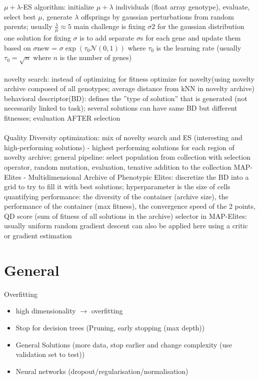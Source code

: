 \documentclass[a4paper, 10pt, twocolumn]{article}
\begin{document}
$\mu + \lambda$-ES algorithm: initialize $\mu + \lambda$ individuals (float array genotype), evaluate, select best $\mu$, generate
$\lambda$ offsprings by gaussian perturbations from random parents; usually $\frac{\lambda}{\mu} \approx 5$
main challenge is fixing $\sigma$2 for the gaussian distribution
one solution for fixing $\sigma$ is to add separate $\sigma$s for each gene and update them based on $\sigma$new = $\sigma \exp (\tau_0 \mathcal{N}(0, 1))$
where $\tau_0$ is the learning rate (usually $\tau_0 = \sqrt{n}$ where $n$ is the number of genes) \\ \\

novelty search: instead of optimizing for fitness optimize for novelty(using novelty archive composed of all
genotypes; average distance from kNN in novelty archive) behavioral descriptor(BD): defines the ”type
of solution” that is generated (not necessarily linked to task); several solutions can have same BD but
different fitnesses; evaluation AFTER selection \\ \\ 

Quality Diversity optimization: mix of novelty search and ES (interesting and high-performing solutions)
- highest performing solutions for each region of novelty archive; general pipeline: select population from
collection with selection operator, random mutation, evaluation, tenative addition to the collection
MAP-Elites - Multidimensional Archive of Phenotypic Elites: discretize the BD into a grid to try to fill it
with best solutions; hyperparameter is the size of cells
quantifying performance: the diversity of the container (archive size), the performance of the container
(max fitness), the convergence speed of the 2 points, QD score (sum of fitness of all solutions in the archive)
selector in MAP-Elites: usually uniform random
gradient descent can also be applied here using a critic or gradient estimation
\section{General}
Overfitting
\begin{itemize}[topsep=0pt,itemsep=-1ex,partopsep=1ex,parsep=1ex]
	\item high dimensionality $\rightarrow$  overfitting
	\item Stop for decision trees (Pruning, early stopping (max depth))
	\item General Solutions (more data, stop earlier and change complexity (use validation set to test))
	\item Neural networks (dropout/regularisation/normalisation)
\end{itemize}
\end{document}
